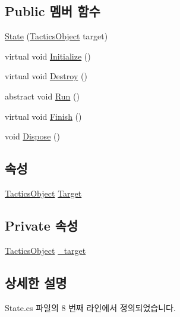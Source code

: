 \subsection*{Public 멤버 함수}
\begin{DoxyCompactItemize}
\item 
\hyperlink{class_m_c_n_1_1_state_ad16fc582097e88164f2804183830344e}{State} (\hyperlink{class_tactics_object}{Tactics\+Object} target)
\item 
virtual void \hyperlink{class_m_c_n_1_1_state_a5be59bc891e64cbbe4322d74a6746908}{Initialize} ()
\item 
virtual void \hyperlink{class_m_c_n_1_1_state_aebf48ef248bbf185d6aae91d9789459e}{Destroy} ()
\item 
abstract void \hyperlink{class_m_c_n_1_1_state_afdec72a816a8a8ec584cac758a027215}{Run} ()
\item 
virtual void \hyperlink{class_m_c_n_1_1_state_a2492ca731678b8216c02134dddeeb745}{Finish} ()
\item 
void \hyperlink{class_m_c_n_1_1_state_af6df0477e0dead784489688cb2c2093e}{Dispose} ()
\end{DoxyCompactItemize}
\subsection*{속성}
\begin{DoxyCompactItemize}
\item 
\hyperlink{class_tactics_object}{Tactics\+Object} \hyperlink{class_m_c_n_1_1_state_a79a563b32f183c9adc9a96679fc57eb8}{Target}
\end{DoxyCompactItemize}
\subsection*{Private 속성}
\begin{DoxyCompactItemize}
\item 
\hyperlink{class_tactics_object}{Tactics\+Object} \hyperlink{class_m_c_n_1_1_state_a13fe398868da354cfde9ff644e12e9f2}{\+\_\+target}
\end{DoxyCompactItemize}


\subsection{상세한 설명}


State.\+cs 파일의 8 번째 라인에서 정의되었습니다.



